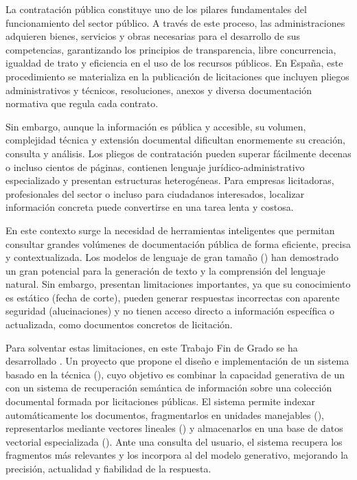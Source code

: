 
La contratación pública constituye uno de los pilares fundamentales del funcionamiento del sector público. A través de este proceso, las administraciones adquieren bienes, servicios y obras necesarias para el desarrollo de sus competencias, garantizando los principios de transparencia, libre concurrencia, igualdad de trato y eficiencia en el uso de los recursos públicos. En España, este procedimiento se materializa en la publicación de licitaciones que incluyen pliegos administrativos y técnicos, resoluciones, anexos y diversa documentación normativa que regula cada contrato.

Sin embargo, aunque la información es pública y accesible, su volumen, complejidad técnica y extensión documental dificultan enormemente su creación, consulta y análisis. Los pliegos de contratación pueden superar fácilmente decenas o incluso cientos de páginas, contienen lenguaje jurídico-administrativo especializado y presentan estructuras heterogéneas. Para empresas licitadoras, profesionales del sector o incluso para ciudadanos interesados, localizar información concreta puede convertirse en una tarea lenta y costosa.

En este contexto surge la necesidad de herramientas inteligentes que permitan consultar grandes volúmenes de documentación pública de forma eficiente, precisa y contextualizada. Los modelos de lenguaje de gran tamaño () han demostrado un gran potencial para la generación de texto y la comprensión del lenguaje natural. Sin embargo, presentan limitaciones importantes, ya que su conocimiento es estático (fecha de corte), pueden generar respuestas incorrectas con aparente seguridad (alucinaciones) y no tienen acceso directo a información específica o actualizada, como documentos concretos de licitación.

Para solventar estas limitaciones, en este Trabajo Fin de Grado se ha desarrollado . Un proyecto que propone el diseño e implementación de un sistema basado en la técnica  (), cuyo objetivo es combinar la capacidad generativa de un  con un sistema de recuperación semántica de información sobre una colección documental formada por licitaciones públicas. El sistema permite indexar automáticamente los documentos, fragmentarlos en unidades manejables (), representarlos mediante vectores lineales () y almacenarlos en una base de datos vectorial especializada (). Ante una consulta del usuario, el sistema recupera los fragmentos más relevantes y los incorpora al  del modelo generativo, mejorando la precisión, actualidad y fiabilidad de la respuesta.

